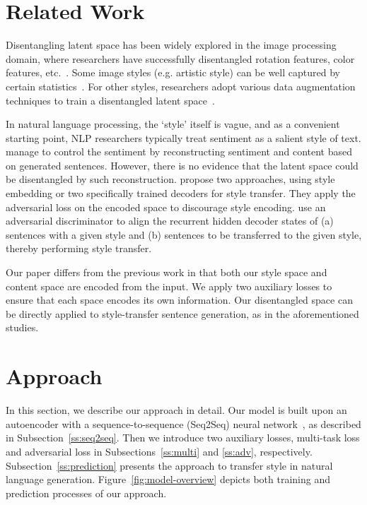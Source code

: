 \documentclass[11pt,a4paper]{article}
\begin{document}
\section{Related Work}


Disentangling latent space has been widely explored in the image processing domain, where researchers have successfully disentangled rotation features, color features, etc.~\cite{chen2016infogan,luan2017deep}. Some image styles (e.g. artistic style) can be well captured by certain statistics~\cite{gatys2016image}. For other styles, researchers adopt various data augmentation techniques to train a disentangled latent space~\cite{champandard2016semantic,kulkarni2015deep}.

In natural language processing, the `style' itself is vague, and as a convenient starting point, NLP researchers typically treat sentiment as a salient style of text.  manage to control the sentiment by reconstructing sentiment and content based on generated sentences. However, there is no evidence that the latent space could be disentangled by such reconstruction.  propose two approaches, using style embedding or two specifically trained decoders for style transfer. They apply the adversarial loss on the encoded space to discourage style encoding.  use an adversarial discriminator to align the recurrent hidden decoder states of (a) sentences with a given style and (b) sentences to be transferred to the given style, thereby performing style transfer.

Our paper differs from the previous work in that both our style space and content space are encoded from the input. We apply two auxiliary losses to ensure that each space encodes its own information. Our disentangled space can be directly applied to style-transfer sentence generation, as in the aforementioned studies.

\section{Approach}

In this section, we describe our approach in detail. Our model is built upon an autoencoder with a sequence-to-sequence (Seq2Seq) neural network~\cite{sutskever2014sequence}, as described in Subsection~\ref{ss:seq2seq}. Then we introduce two auxiliary losses, multi-task loss and adversarial loss in Subsections~\ref{ss:multi} and \ref{ss:adv}, respectively. Subsection~\ref{ss:prediction} presents the approach to transfer style in natural language generation. Figure~\ref{fig:model-overview} depicts both training and prediction processes of our approach.
\end{document}
